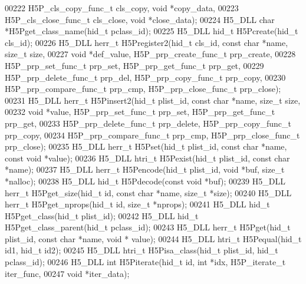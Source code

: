 \begin{DoxyCode}
00222     H5P\_cls\_copy\_func\_t cls\_copy, \textcolor{keywordtype}{void} *copy\_data,
00223     H5P\_cls\_close\_func\_t cls\_close, \textcolor{keywordtype}{void} *close\_data);
00224 H5\_DLL \textcolor{keywordtype}{char} *H5Pget\_class\_name(hid\_t pclass\_id);
00225 H5\_DLL hid\_t H5Pcreate(hid\_t cls\_id);
00226 H5\_DLL herr\_t H5Pregister2(hid\_t cls\_id, \textcolor{keyword}{const} \textcolor{keywordtype}{char} *name, \textcolor{keywordtype}{size\_t} size,
00227     \textcolor{keywordtype}{void} *def\_value, H5P\_prp\_create\_func\_t prp\_create,
00228     H5P\_prp\_set\_func\_t prp\_set, H5P\_prp\_get\_func\_t prp\_get,
00229     H5P\_prp\_delete\_func\_t prp\_del, H5P\_prp\_copy\_func\_t prp\_copy,
00230     H5P\_prp\_compare\_func\_t prp\_cmp, H5P\_prp\_close\_func\_t prp\_close);
00231 H5\_DLL herr\_t H5Pinsert2(hid\_t plist\_id, \textcolor{keyword}{const} \textcolor{keywordtype}{char} *name, \textcolor{keywordtype}{size\_t} size,
00232     \textcolor{keywordtype}{void} *value, H5P\_prp\_set\_func\_t prp\_set, H5P\_prp\_get\_func\_t prp\_get,
00233     H5P\_prp\_delete\_func\_t prp\_delete, H5P\_prp\_copy\_func\_t prp\_copy,
00234     H5P\_prp\_compare\_func\_t prp\_cmp, H5P\_prp\_close\_func\_t prp\_close);
00235 H5\_DLL herr\_t H5Pset(hid\_t plist\_id, \textcolor{keyword}{const} \textcolor{keywordtype}{char} *name, \textcolor{keyword}{const} \textcolor{keywordtype}{void} *value);
00236 H5\_DLL htri\_t H5Pexist(hid\_t plist\_id, \textcolor{keyword}{const} \textcolor{keywordtype}{char} *name);
00237 H5\_DLL herr\_t H5Pencode(hid\_t plist\_id, \textcolor{keywordtype}{void} *buf, \textcolor{keywordtype}{size\_t} *nalloc);
00238 H5\_DLL hid\_t  H5Pdecode(\textcolor{keyword}{const} \textcolor{keywordtype}{void} *buf);
00239 H5\_DLL herr\_t H5Pget\_size(hid\_t \textcolor{keywordtype}{id}, \textcolor{keyword}{const} \textcolor{keywordtype}{char} *name, \textcolor{keywordtype}{size\_t} *size);
00240 H5\_DLL herr\_t H5Pget\_nprops(hid\_t \textcolor{keywordtype}{id}, \textcolor{keywordtype}{size\_t} *nprops);
00241 H5\_DLL hid\_t H5Pget\_class(hid\_t plist\_id);
00242 H5\_DLL hid\_t H5Pget\_class\_parent(hid\_t pclass\_id);
00243 H5\_DLL herr\_t H5Pget(hid\_t plist\_id, \textcolor{keyword}{const} \textcolor{keywordtype}{char} *name, \textcolor{keywordtype}{void} * value);
00244 H5\_DLL htri\_t H5Pequal(hid\_t id1, hid\_t id2);
00245 H5\_DLL htri\_t H5Pisa\_class(hid\_t plist\_id, hid\_t pclass\_id);
00246 H5\_DLL \textcolor{keywordtype}{int} H5Piterate(hid\_t \textcolor{keywordtype}{id}, \textcolor{keywordtype}{int} *idx, H5P\_iterate\_t iter\_func,
00247             \textcolor{keywordtype}{void} *iter\_data);

\end{DoxyCode}
